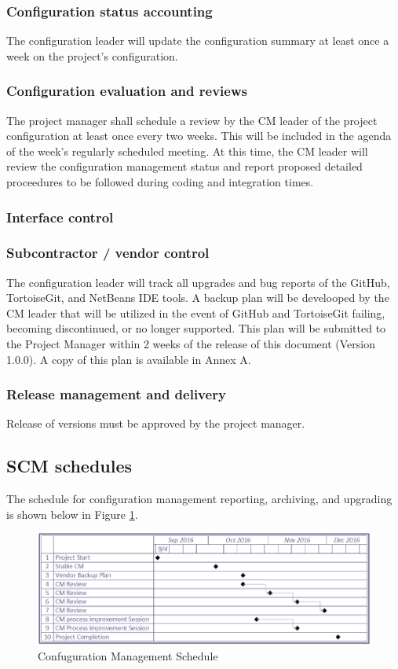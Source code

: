 \documentclass{scrartcl}
\begin{document}
\subsubsection{Configuration status accounting}
The configuration leader will update the configuration summary at least once a week on the project's configuration.
\subsubsection{Configuration evaluation and reviews}
The project manager shall schedule a review by the CM leader of the project configuration at least once every two weeks.  This will be included in the agenda of the week's regularly scheduled meeting.  At this time, the CM leader will review the configuration management status and report proposed detailed proceedures to be followed during coding and integration times.
\subsubsection{Interface control}

\subsubsection{Subcontractor / vendor control}
The configuration leader will track all upgrades and bug reports of the GitHub, TortoiseGit, and NetBeans IDE tools.  A backup plan will be develooped by the CM leader that will be utilized in the event of GitHub and TortoiseGit failing, becoming discontinued, or no longer supported.  This plan will be submitted to the Project Manager within 2 weeks of the release of this document (Version 1.0.0).  A copy of this plan is available in Annex A.
\subsubsection{Release management and delivery}
Release of versions must be approved by the project manager.

\subsection{SCM schedules}
The schedule for configuration management reporting, archiving, and upgrading is shown below in Figure \ref{fig:schedule}.
\begin{figure}[H]
\centering
\includegraphics[scale=0.65]{CMSchedule}
 \caption{Confuguration Management Schedule}
 \label{fig:schedule}
\end{figure}
\end{document}

